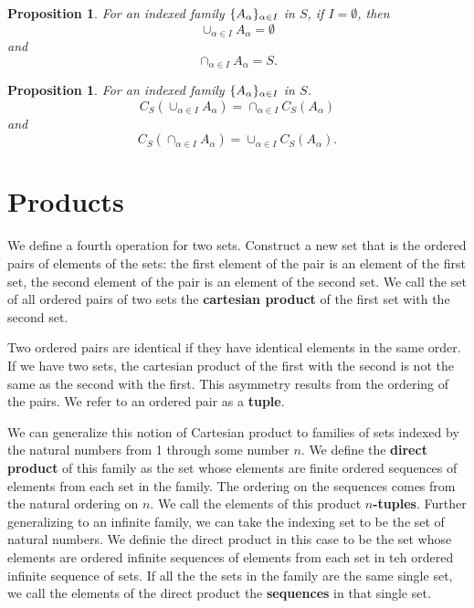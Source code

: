 \documentclass[18pt]{article}
\newcommand{\definition}[1]{\textbf{#1}}
\DeclarePairedDelimiter{\set}{\{}{\}}
\newcommand{\union}{\cup}
\newcommand{\intersect}{\cap}
\newtheorem{prop}[thm]{Proposition}
\begin{document}
\begin{prop}
  For an indexed family $\set{A_{\alpha}}_{\alpha \in I}$ in $S$, if $I = \emptyset$, then
  \[
    \union_{\alpha \in I} A_{\alpha} = \emptyset
  \]
  and
  \[
    \intersect_{\alpha \in I} A_{\alpha} = S.
  \]
\end{prop}

\begin{prop}
  For an indexed family $\set{A_{\alpha}}_{\alpha \in I}$ in $S$.
  \[
    C_S(\union_{\alpha \in I} A_{\alpha}) = \intersect_{\alpha \in I} C_S(A_{\alpha})
  \]
  and
  \[
    C_S(\intersect_{\alpha \in I} A_{\alpha}) = \union_{\alpha \in I} C_S(A_{\alpha}).
  \]
\end{prop}

\section{Products}

We define a fourth operation for two sets.
Construct a new set that is the ordered pairs of elements of the sets: the first element of the pair is an element of the first set, the second element of the pair is an element of the second set.
We call the set of all ordered pairs of two sets the \definition{cartesian product} of the first set with the second set.

Two ordered pairs are identical if they have identical elements in the same order.
If we have two sets, the cartesian product of the first with the second is not the same as the second with the first.
This asymmetry results from the ordering of the pairs.
We refer to an ordered pair as a \definition{tuple}.

We can generalize this notion of Cartesian product to families of sets indexed by the natural numbers from 1 through some number $n$.
We define the \definition{direct product} of this family as the set whose elements are finite ordered sequences of elements from each set in the family.
The ordering on the sequences comes from the natural ordering on $n$.
We call the elements of this product \definition{$n$-tuples}.
Further generalizing to an infinite family, we can take the indexing set to be the set of natural numbers.
We definie the direct product in this case to be the set whose elements are ordered infinite sequences of elements from each set in teh ordered infinite sequence of sets.
If all the the sets in the family are the same single set, we call the elements of the direct product the \definition{sequences} in that single set.
\end{document}
